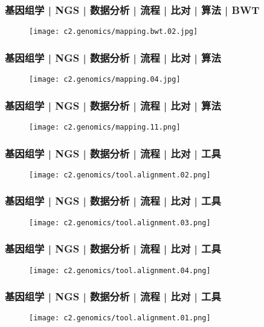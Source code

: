 \begin{frame}
  \frametitle{基因组学 | NGS | 数据分析 | 流程 | 比对 | 算法 | BWT}
  \begin{figure}
    \centering
    \texttt{[image: c2.genomics/mapping.bwt.02.jpg]}
  \end{figure}
\end{frame}

\begin{frame}
  \frametitle{基因组学 | NGS | 数据分析 | 流程 | 比对 | 算法}
  \begin{figure}
    \centering
    \texttt{[image: c2.genomics/mapping.04.jpg]}
  \end{figure}
\end{frame}

\begin{frame}
  \frametitle{基因组学 | NGS | 数据分析 | 流程 | 比对 | 算法}
  \begin{figure}
    \centering
    \texttt{[image: c2.genomics/mapping.11.png]}
  \end{figure}
\end{frame}

\begin{frame}
  \frametitle{基因组学 | NGS | 数据分析 | 流程 | 比对 | 工具}
  \begin{figure}
    \centering
    \texttt{[image: c2.genomics/tool.alignment.02.png]}
  \end{figure}
\end{frame}

\begin{frame}
  \frametitle{基因组学 | NGS | 数据分析 | 流程 | 比对 | 工具}
  \begin{figure}
    \centering
    \texttt{[image: c2.genomics/tool.alignment.03.png]}
  \end{figure}
\end{frame}

\begin{frame}
  \frametitle{基因组学 | NGS | 数据分析 | 流程 | 比对 | 工具}
  \begin{figure}
    \centering
    \texttt{[image: c2.genomics/tool.alignment.04.png]}
  \end{figure}
\end{frame}

\begin{frame}
  \frametitle{基因组学 | NGS | 数据分析 | 流程 | 比对 | 工具}
  \begin{figure}
    \centering
    \texttt{[image: c2.genomics/tool.alignment.01.png]}
  \end{figure}
\end{frame}

